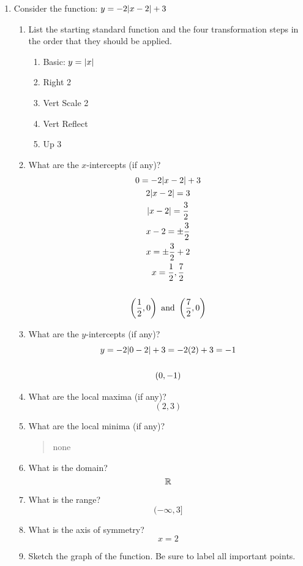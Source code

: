 \documentclass[letterpaper,12pt,fleqn]{article}
\begin{document}
\begin{enumerate}
\item Consider the function: $y=-2\lvert x-2\rvert+3$
  \begin{enumerate}
  \item List the starting standard function and the four transformation steps in the order that they should be
    applied.
    \begin{enumerate}
    \item Basic: \(y=\lvert x\rvert\)
    \item Right 2
    \item Vert Scale 2
    \item Vert Reflect
    \item Up 3
    \end{enumerate}
  \item What are the $x$-intercepts (if any)?
    \begin{gather*}
      0=-2\lvert x-2\rvert+3 \\
      2\lvert x-2\rvert=3 \\
      \lvert x-2\rvert=\frac{3}{2} \\
      x-2=\pm\frac{3}{2} \\
      x=\pm\frac{3}{2}+2 \\
      x=\frac{1}{2},\frac{7}{2} \\
      \\
      \left(\frac{1}{2},0\right)\ \text{and}\ \left(\frac{7}{2},0\right)
    \end{gather*}
  \item What are the $y$-intercepts (if any)?
    \begin{gather*}
      y=-2\lvert0-2\rvert+3=-2(2)+3=-1 \\
      \\
      (0,-1)
    \end{gather*}
  \item What are the local maxima (if any)?
    \[(2,3)\]
  \item What are the local minima (if any)?
    \begin{quote}
      none
    \end{quote}
  \item What is the domain?
    \[\mathbb{R}\]
  \item What is the range?
    \[(-\infty,3]\]
  \item What is the axis of symmetry?
    \[x=2\]
  \item Sketch the graph of the function. Be sure to label all important points.

  \end{enumerate}
\end{enumerate}
\end{document}

